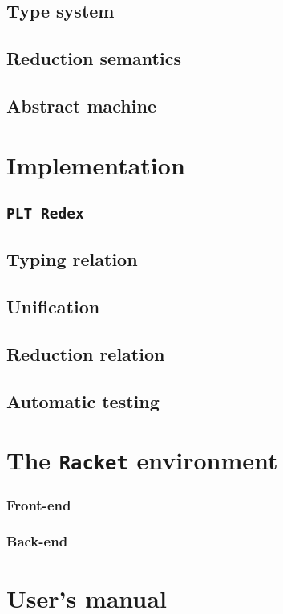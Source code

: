 \documentclass[inz, english, shortabstract]{iithesis}
\newcommand{\Redex}{\texttt{PLT Redex} }
\newcommand{\Racket}{\texttt{Racket} }
\begin{document}
\section{Type system}

\section{Reduction semantics}

\section{Abstract machine}


\chapter{Implementation}

\section{\Redex}

\section{Typing relation}

\section{Unification}

\section{Reduction relation}

\section{Automatic testing}


\chapter{The \Racket environment}

\subsection{Front-end}

\subsection{Back-end}


\chapter{User's manual}

\printbibliography

\end{document}

